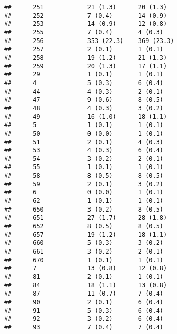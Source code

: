 \documentclass[]{article}
\begin{document}
\begin{verbatim}
##      251            21 (1.3)      20 (1.3)                      
##      252            7 (0.4)       14 (0.9)                      
##      253            14 (0.9)      12 (0.8)                      
##      255            7 (0.4)       4 (0.3)                       
##      256            353 (22.3)    369 (23.3)                    
##      257            2 (0.1)       1 (0.1)                       
##      258            19 (1.2)      21 (1.3)                      
##      259            20 (1.3)      17 (1.1)                      
##      29             1 (0.1)       1 (0.1)                       
##      4              5 (0.3)       6 (0.4)                       
##      44             4 (0.3)       2 (0.1)                       
##      47             9 (0.6)       8 (0.5)                       
##      48             4 (0.3)       3 (0.2)                       
##      49             16 (1.0)      18 (1.1)                      
##      5              1 (0.1)       1 (0.1)                       
##      50             0 (0.0)       1 (0.1)                       
##      51             2 (0.1)       4 (0.3)                       
##      53             4 (0.3)       6 (0.4)                       
##      54             3 (0.2)       2 (0.1)                       
##      55             1 (0.1)       1 (0.1)                       
##      58             8 (0.5)       8 (0.5)                       
##      59             2 (0.1)       3 (0.2)                       
##      6              0 (0.0)       1 (0.1)                       
##      62             1 (0.1)       1 (0.1)                       
##      650            3 (0.2)       8 (0.5)                       
##      651            27 (1.7)      28 (1.8)                      
##      652            8 (0.5)       8 (0.5)                       
##      657            19 (1.2)      18 (1.1)                      
##      660            5 (0.3)       3 (0.2)                       
##      661            3 (0.2)       2 (0.1)                       
##      670            1 (0.1)       1 (0.1)                       
##      7              13 (0.8)      12 (0.8)                      
##      81             2 (0.1)       1 (0.1)                       
##      84             18 (1.1)      13 (0.8)                      
##      87             11 (0.7)      7 (0.4)                       
##      90             2 (0.1)       6 (0.4)                       
##      91             5 (0.3)       6 (0.4)                       
##      92             3 (0.2)       6 (0.4)                       
##      93             7 (0.4)       7 (0.4)                       

\end{verbatim}
\end{document}
